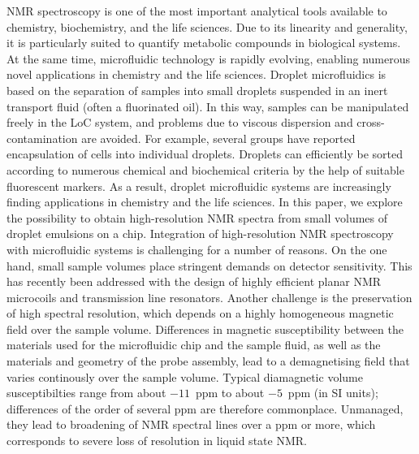 

NMR spectroscopy is one of the most important analytical tools
available to chemistry, biochemistry, and the life sciences.
Due to its linearity and generality, it is particularly suited
to quantify metabolic compounds in biological systems.\cite{Aranibar:2011dc,Wishart:2008ga}
At the same time, microfluidic
technology is rapidly evolving, enabling numerous novel applications in
chemistry and the life sciences. Droplet
microfluidics is based on the separation of samples into small droplets
suspended in an inert transport fluid (often a fluorinated oil).
\cite{Thorsen:2001gt,Anna:2003ci,Gunther:2006vd,Garstecki:2006tn}
In this way, samples can be manipulated freely in the LoC system,
and problems due to viscous dispersion and cross-contamination
are avoided. For example, several groups have reported encapsulation
of cells into individual droplets.\cite{Lagus:2013bxb,Mazutis:2013ig}  Droplets can
efficiently be sorted according to numerous chemical and
biochemical criteria by the help of suitable fluorescent markers.
As a result, droplet microfluidic systems are increasingly finding applications
in chemistry\cite{Theberge:2012iq} and the
life sciences.\cite{Zhu:2013er,Mazutis:2013ig} In this paper, we explore
the possibility to obtain high-resolution NMR spectra from
small volumes of droplet emulsions on a chip.
Integration of high-resolution NMR spectroscopy with microfluidic systems is
challenging for a number of reasons.
On the one hand, small sample volumes place stringent demands on detector
sensitivity.\cite{Badilita:2011td,Zalesskiy:2014hi}
This has recently been addressed with the design of
highly efficient planar NMR microcoils \cite{Spengler:2016km} and
transmission line resonators.\cite{Finch:2016gv}
Another challenge is the preservation of high spectral
resolution, which depends on a highly homogeneous magnetic field
over the sample volume. Differences in magnetic susceptibility
between the materials used for the microfluidic chip
and the sample fluid, as well as the materials and geometry
of the probe assembly, lead to a demagnetising field
that varies continously over the sample volume. Typical diamagnetic
volume susceptibilties range from about
$-11$~ppm to about $-5$~ppm (in SI units);\cite{Kuchel:2003ip,Durrant:2003kv}
differences of the order of several ppm are therefore commonplace.
Unmanaged, they lead to
broadening of NMR spectral lines over a ppm or more, which
corresponds to severe loss of resolution in  liquid
state NMR.

